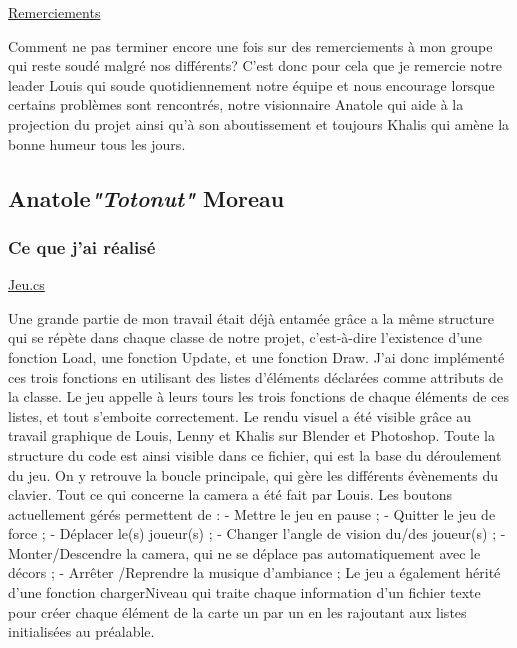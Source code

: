 \documentclass{article}
\begin{document}
\par
\underline{Remerciements}
\newline
\par
Comment ne pas terminer encore une fois sur des remerciements à mon groupe qui reste soudé malgré nos différents? C'est donc pour cela que je remercie notre leader Louis qui soude quotidiennement notre équipe et nous encourage lorsque certains problèmes sont rencontrés, notre visionnaire Anatole qui aide à la projection du projet ainsi qu'à son aboutissement et toujours Khalis qui amène la bonne humeur tous les jours.

\newpage

\subsection {Anatole\textcolor {pseudoblue} {\textit {"Totonut"}} Moreau}

\subsubsection {Ce que j'ai réalisé}
\underline{Jeu.cs}
\par
Une grande partie de mon travail était déjà entamée grâce a la même structure qui se répète dans chaque classe de notre projet, c’est-à-dire l’existence d’une fonction Load, une fonction Update, et une fonction Draw. J’ai donc implémenté ces trois fonctions en utilisant des listes d’éléments déclarées comme attributs de la classe. Le jeu appelle à leurs tours les trois fonctions de chaque éléments de ces listes, et tout s’emboite correctement. Le rendu visuel a été visible grâce au travail graphique de Louis, Lenny et Khalis sur Blender et Photoshop. Toute la structure du code est ainsi visible dans ce fichier, qui est la base du déroulement du jeu. On y retrouve la boucle principale, qui gère les différents évènements du clavier. Tout ce qui concerne la camera a été fait par Louis. Les boutons actuellement gérés permettent de :
- Mettre le jeu en pause ;
- Quitter le jeu de force ;
- Déplacer le(s) joueur(s) ;
- Changer l’angle de vision du/des joueur(s) ;
- Monter/Descendre la camera, qui ne se déplace pas automatiquement avec le décors ;
- Arrêter /Reprendre la musique d’ambiance ;
Le jeu a également hérité d’une fonction chargerNiveau qui traite chaque information d’un fichier texte pour créer chaque élément de la carte un par un en les rajoutant aux listes initialisées au préalable.
\newline
\end{document}
